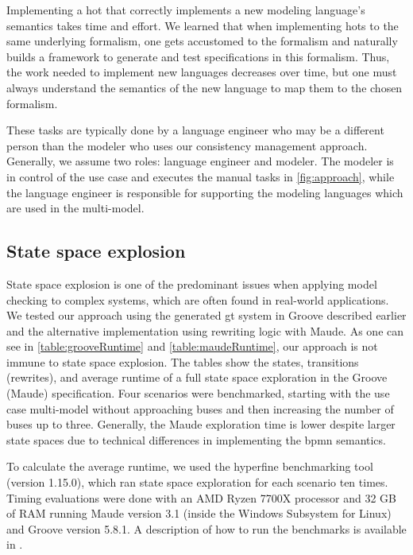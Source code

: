 \documentclass{jot}
\begin{document}
Implementing a \gls*{hot} that correctly implements a new modeling language's semantics takes time and effort.
We learned that when implementing \glspl*{hot} to the same underlying formalism, one gets accustomed to the formalism and naturally builds a framework to generate and test specifications in this formalism.
Thus, the work needed to implement new languages decreases over time, but one must always understand the semantics of the new language to map them to the chosen formalism.

These tasks are typically done by a language engineer who may be a different person than the modeler who uses our consistency management approach.
Generally, we assume two roles: language engineer and modeler.
The modeler is in control of the use case and executes the manual tasks in \autoref{fig:approach}, while the language engineer is responsible for supporting the  modeling languages which are used in the multi-model.


\subsection{State space explosion}
State space explosion is one of the predominant issues when applying model checking to complex systems, which are often found in real-world applications.
We tested our approach using the generated \gls*{gt} system in Groove described earlier and the alternative implementation using rewriting logic with Maude.
As one can see in \cref{table:grooveRuntime} and \cref{table:maudeRuntime}, our approach is not immune to state space explosion.
The tables show the states, transitions (rewrites), and average runtime of a full state space exploration in the Groove (Maude) specification.
Four scenarios were benchmarked, starting with the use case multi-model without approaching buses and then increasing the number of buses up to three.
Generally, the Maude exploration time is lower despite larger state spaces due to technical differences in implementing the \gls*{bpmn} semantics.

To calculate the average runtime, we used the hyperfine benchmarking tool \cite{peterHyperfine2022} (version 1.15.0), which ran state space exploration for each scenario ten times.
Timing evaluations were done with an AMD Ryzen 7700X processor and 32 GB of RAM running Maude version 3.1 (inside the Windows Subsystem for Linux) and Groove version 5.8.1.
A description of how to run the benchmarks is available in \cite{krauterArtifactsBehavioralConsistency2023}.
\end{document}
